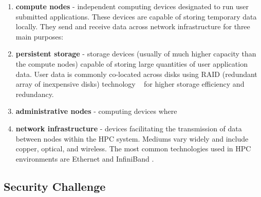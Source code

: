 \documentclass{article}
\begin{document}
\begin{enumerate} \itemsep1pt \parskip0pt 
\item \textbf{compute nodes} - independent computing devices designated to run user submitted applications. These devices are capable of storing temporary data locally. They send and receive data across network infrastructure for three main purposes:
\item \textbf{persistent storage} - storage devices (usually of much higher capacity than the compute nodes) capable of storing large quantities of user application data. User data is commonly co-located across disks using RAID (redundant array of inexpensive disks) technology ~\cite{katz1989disk} for higher storage efficiency and redundancy. 
\item \textbf{administrative nodes} - computing devices where 
\item \textbf{network infrastructure} - devices facilitating the transmission of data between nodes within the HPC system. Mediums vary widely and include copper, optical, and wireless. The most common technologies used in HPC environments are Ethernet and InfiniBand \cite{bozzo2006design}\cite{madai2010performance}. 
\end{enumerate}
\subsection{Security Challenge}
\end{document}
